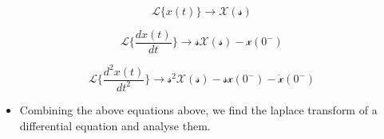 \documentclass[11pt]{article}
\providecommand{\tightlist}{%
      \setlength{\itemsep}{0pt}\setlength{\parskip}{0pt}}
\begin{document}
\begin{equation}
    \mathscr{L}\{x(t)\} \to \mathcal{X(s)}
\end{equation}

\begin{equation}
    \mathscr{L}\{\frac{dx(t)}{dt}\} \to \mathcal{sX(s)-x(0^{-})}
\end{equation}

\begin{equation}
    \mathscr{L}\{\frac{d^{2}x(t)}{dt^{2}}\} \to \mathcal{s^{2}X(s)-sx(0^{-})-\dot x(0^{-})}
\end{equation}

\begin{itemize}
\tightlist
\item
  Combining the above equations above, we find the laplace transform of
  a differential equation and analyse them.
\end{itemize}
\end{document}
